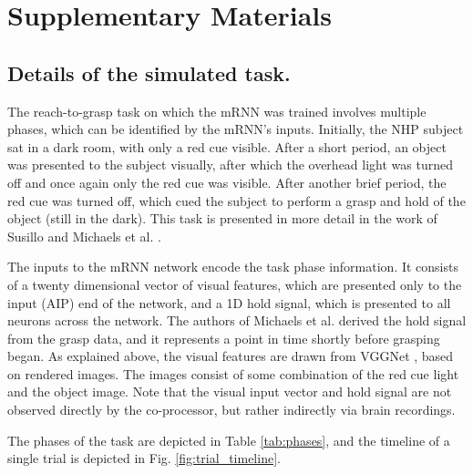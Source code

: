 \documentclass[12pt]{iopart}
\begin{document}
\newpage

\section{Supplementary Materials}
\subsection{Details of the simulated task.}
\label{sup:michaelstask}

The reach-to-grasp task on which the mRNN was trained involves multiple phases, which can be identified by the
mRNN's inputs. Initially, the NHP subject sat in a dark room, with only a red cue visible. After a short period,
an object was presented to the subject visually, after which the overhead light was turned off and once again only the red
cue was visible. After another brief period, the red cue was turned off, which cued the subject to perform a grasp and hold of
the object (still in the dark). This task is presented in more detail in the work of Susillo \cite{susillo.mrnn} and Michaels et al.
\cite{michaels.mrnn}.

The inputs to the mRNN network encode the task phase information. It consists of a twenty dimensional vector of visual
features, which are presented only to the input (AIP) end of the network, and a 1D hold signal, which is presented to all
neurons across the network. The authors of Michaels et al. \cite{michaels.mrnn} derived the hold signal
from the grasp data, and it represents a point in time shortly before grasping began. As explained above, the visual features are
drawn from VGGNet \cite{simonyan.vgg}, based on rendered images. The images consist of some combination of the red cue
light and the object image. Note that the visual input vector and hold signal are not observed directly by the co-processor,
but rather indirectly via brain recordings.

The phases of the task are depicted in Table \ref{tab:phases}, and the timeline of a single trial is depicted in Fig. \ref{fig:trial_timeline}.
\end{document}
